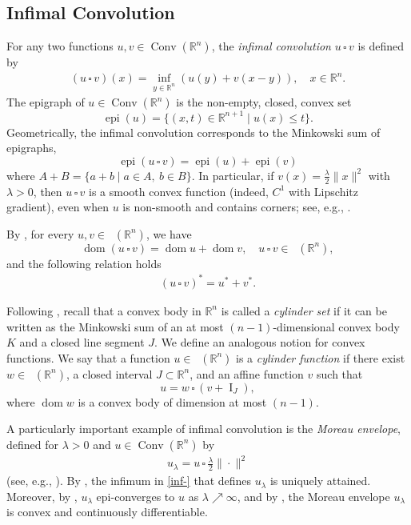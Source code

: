 \documentclass[11pt]{article}
\theoremstyle{definition} %
\newcommand{\RR}{(\mathbb{R}^n)}
\DeclareMathOperator{\Conv}{Conv}
\DeclareMathOperator{\I}{I}
\DeclareMathOperator{\dom}{dom}
\DeclareMathOperator{\epi}{epi}
\DeclareMathOperator{\LC}{Conv_{ld}}
\DeclareMathOperator{\LP}{Conv_{lp}}
\begin{document}
\subsection{Infimal Convolution}\label{bauschke2011convex}
For any two functions $u,v\in \Conv(\mathbb{R}^n)$, the \textit{infimal convolution} $u\,\square\, v$ is defined by
\begin{align}\label{inf-}
   \left(u\,\square\, v\right)(x)=\inf_{y\in\mathbb{R}^n}\left(u(y)+v(x-y)\right), \quad x\in \mathbb{R}^n.
\end{align}
The epigraph of $u\in \Conv(\mathbb{R}^n)$ is the non-empty, closed, convex set
\begin{equation*}
    \epi(u)=\{(x, t)\in\mathbb{R}^{n+1}\mid  u(x)\leq t \}.
\end{equation*} 
Geometrically, the infimal convolution corresponds to the Minkowski sum of epigraphs,
$$
\epi(u\,\square\, v)= \epi(u)+\epi(v)
$$
where $A+B=\{a+b \mid a\in A,\ b\in B\}$.
In particular, if $v(x)=\frac{\lambda}{2}\|x\|^2$ with $\lambda>0$, then $u\,\square\, v$ is a smooth convex function (indeed, $C^1$ with Lipschitz gradient), even when $u$ is non-smooth and contains corners; see, e.g., \cite[Theorem~2.26]{rockafellar2009variational}.



By \cite[Proposition 2.1 and Proposition~2.6]{colesanti2013first}, for every $u,v\in\LP\RR$, we have 
$$
\dom(u\,\square\, v)= \dom u + \dom v, 
\quad u\,\square\, v\in\LP\RR,
$$
and the following relation holds
\begin{align}\label{inf-sum}
    (u\,\square\, v)^* = u^*+v^*.
\end{align}


Following \cite{ludwig1999characterization}, recall that a convex body in $\mathbb{R}^n$ is called a \textit{cylinder set} if it can be written as the Minkowski sum of an at most $(n-1)$-dimensional convex body $K$ and a closed line segment $J$. We define an analogous notion for convex functions.  
We say that a function $u\in\LC\RR$ is a \textit{cylinder function} if there exist $w \in \LC(\mathbb{R}^n)$, a closed interval $J\subset \mathbb{R}^n$, and an affine function $v$ such that
$$
u=w\,\square\, (v+\I_{J}),
$$
where $\dom w$ is a convex body of dimension at most $(n-1)$. 


A particularly important example of infimal convolution is the \textit{Moreau envelope}, defined for $\lambda>0$ and $u\in \Conv(\mathbb{R}^n)$ by
\begin{align*}
    u_{\lambda}= u\,\square\, \frac{\lambda}{2}\|\cdot\|^2
\end{align*}
(see, e.g., \cite{bauschke2011convex,rockafellar2009variational}). By \cite[Proposition 12.15]{bauschke2011convex}, the infimum in \eqref{inf-} that defines $u_{\lambda}$ is uniquely attained. Moreover, by \cite[Theorem 1.25]{rockafellar2009variational},  $u_\lambda$ epi-converges to $u$ as $\lambda \nearrow \infty$, and by \cite[Theorem 2.26]{rockafellar2009variational}, the Moreau envelope $u_\lambda$  is convex and continuously differentiable. 
\end{document}
